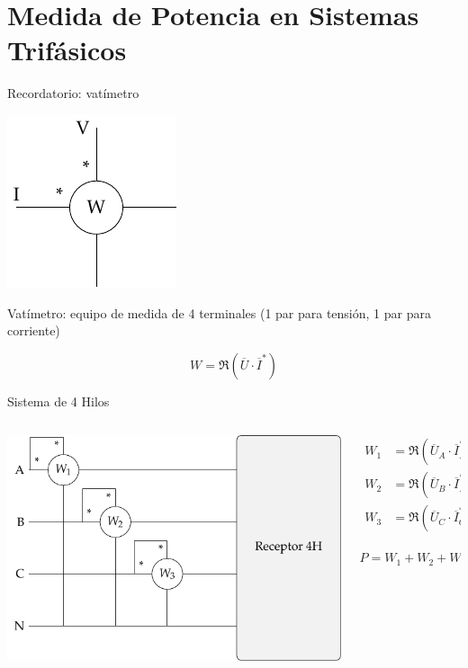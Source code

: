 \documentclass[xcolor={usenames,svgnames,dvipsnames}]{beamer}
\begin{document}
\section{Medida de Potencia en Sistemas Trifásicos}
\label{sec:org1e6e172}
\begin{frame}[label={sec:orgf3aa117}]{Recordatorio: vatímetro}
\begin{center}
\includegraphics[height=0.6\textheight]{figs/vatimetro.pdf}
\end{center}

\alert{Vatímetro}: equipo de medida de 4 terminales (1 par para tensión, 1 par para corriente)

\[
  \boxed{W = \Re(\overline{U} \cdot \overline{I}^*)}
\]
\end{frame}
\begin{frame}[label={sec:org1fbcc98}]{Sistema de 4 Hilos}
\begin{columns}
\begin{column}{0.7\columnwidth}
\begin{center}
\includegraphics[width=.9\linewidth]{figs/Potencia4H.pdf}
\end{center}
\end{column}

\begin{column}{0.3\columnwidth}
\begin{align*}
  W_1 &= \Re(\overline{U}_A \cdot \overline{I}_A^*) = P_A\\
  W_2 &= \Re(\overline{U}_B \cdot \overline{I}_B^*) = P_B\\
  W_3 &= \Re(\overline{U}_C \cdot \overline{I}_C^*) = P_C\\
\end{align*}

\[
  \boxed{P = W_1 + W_2 + W_3}
\]
\end{column}
\end{columns}
\end{frame}
\end{document}
